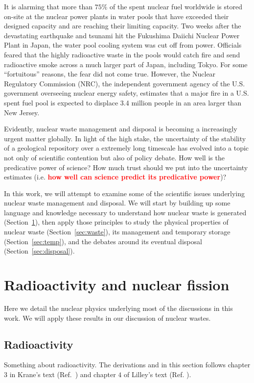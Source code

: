 \documentclass[nofootinbib,preprint,aps]{revtex4-1}
\newcommand{\red}[1]{\textcolor{red}{\bf #1}}
\begin{document}
It is alarming that more than $75\%$ of the spent nuclear fuel worldwide is stored on-site at the nuclear power plants
in water pools that have exceeded their designed capacity and are reaching their limiting capacity.\cite{aa12}
Two weeks after the devastating earthquake and tsunami hit the Fukushima Daiichi Nuclear Power Plant in Japan,
the water pool cooling system was cut off from power. Officials feared that
the highly radioactive waste in the pools would catch fire and send radioactive smoke
across a much larger part of Japan, including Tokyo.\cite{s16} For some ``fortuitous'' reasons, the fear did not come true.
However, the Nuclear Regulatory Commission (NRC), the independent government agency
of the U.S. government overseeing nuclear energy safety,
estimates that a major fire in a U.S. spent fuel pool is expected to
displace 3.4 million people in an area larger than New Jersey.\cite{s16}

Evidently, nuclear waste management and disposal is becoming a increasingly urgent matter globally.
In light of the high stake,
the uncertainty of the stability of a geological repository over a extremely long timescale has evolved into 
a topic not only of scientific contention but also of policy debate.
How well is the predicative power of science? How much trust should we put into the uncertainty estimates
(i.e. \red{how well can science predict its predicative power})?

In this work, we will attempt to examine some of the scientific issues underlying nuclear waste management
and disposal. We will start by building up some
language and knowledge necessary to understand how nuclear waste is generated (Section~\ref{sec:phys}),
then apply those principles to study
the physical properties of nuclear waste (Section~\ref{sec:waste}), its management and temporary storage
(Section~\ref{sec:temp}), and the debates around its eventual disposal (Section~\ref{sec:disposal}).

\section{Radioactivity and nuclear fission}
\label{sec:phys}
    Here we detail the nuclear physics underlying most of the discussions
    in this work. We will apply these results in our discussion of nuclear wastes.
    \subsection{Radioactivity}
    Something about radioactivity. The derivations and in this section follows chapter $3$ in
    Krane's text (Ref.~) and chapter $4$ of Lilley's text (Ref. ).
\end{document}
